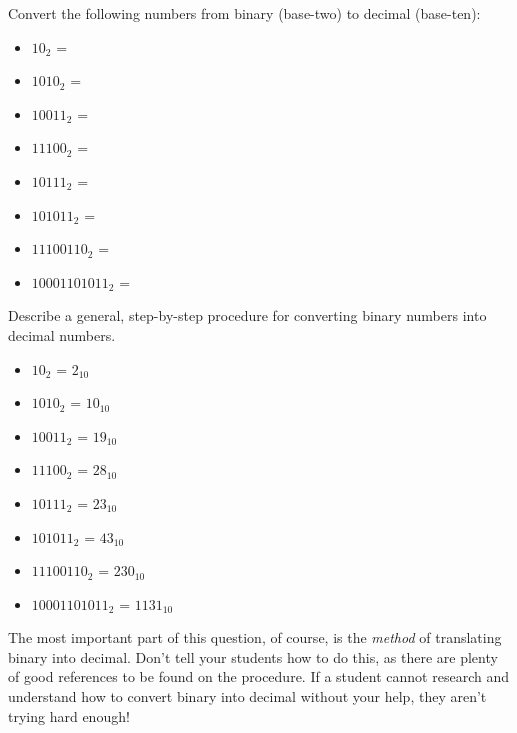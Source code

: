 

Convert the following numbers from binary (base-two) to decimal (base-ten):

\begin{itemize}
\item{} $10_2$ =
\vskip 5pt
\item{} $1010_2$ =
\vskip 5pt
\item{} $10011_2$ =
\vskip 5pt
\item{} $11100_2$ = 
\vskip 5pt
\item{} $10111_2$ = 
\vskip 5pt
\item{} $101011_2$ = 
\vskip 5pt
\item{} $11100110_2$ = 
\vskip 5pt
\item{} $10001101011_2$ = 
\end{itemize}

Describe a general, step-by-step procedure for converting binary numbers into decimal numbers.







\begin{itemize}
\item{} $10_2$ = $2_{10}$
\vskip 5pt
\item{} $1010_2$ = $10_{10}$
\vskip 5pt
\item{} $10011_2$ = $19_{10}$
\vskip 5pt
\item{} $11100_2$ =  $28_{10}$
\vskip 5pt
\item{} $10111_2$ =  $23_{10}$
\vskip 5pt
\item{} $101011_2$ =  $43_{10}$
\vskip 5pt
\item{} $11100110_2$ = $230_{10}$
\vskip 5pt
\item{} $10001101011_2$ = $1131_{10}$ 
\end{itemize}







The most important part of this question, of course, is the {\it method} of translating binary into decimal.  Don't tell your students how to do this, as there are plenty of good references to be found on the procedure.  If a student cannot research and understand how to convert binary into decimal without your help, they aren't trying hard enough!




